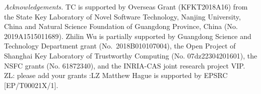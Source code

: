 \documentclass{llncs}
\newcommand{\zhilin}[1]{\color{cyan} {ZL: #1 :LZ} \color{black}}
\begin{document}
\smallskip
\noindent \emph{Acknowledgements.}
TC is supported by Overseas
Grant (KFKT2018A16) from the State Key Laboratory of
Novel Software Technology, Nanjing University, China and Natural Science Foundation of Guangdong Province, China (No. 2019A1515011689). 
Zhilin Wu is partially supported by Guangdong Science and Technology Department grant (No.\ 2018B010107004), the Open Project of Shanghai Key Laboratory of Trustworthy Computing (No. 07dz22304201601), the NSFC grants (No. 61872340), and the INRIA-CAS joint research project VIP.  \zhilin{please add your grants}
Matthew Hague is supported by EPSRC [EP/T00021X/1].

\vspace{-3mm}




%

\end{document}

